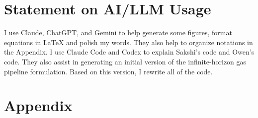 \documentclass[11pt]{article}
\begin{document}
\section*{Statement on AI/LLM Usage}

I use Claude, ChatGPT, and Gemini to help generate some figures, format equations in LaTeX and polish my words. They also help to organize notations in the Appendix. I use Claude Code and Codex to explain Sakshi's code and Owen's code. They also assist in generating an initial version of the infinite-horizon gas pipeline formulation. Based on this version, I rewrite all of the code.

\newpage
\section*{Appendix}
\end{document}
